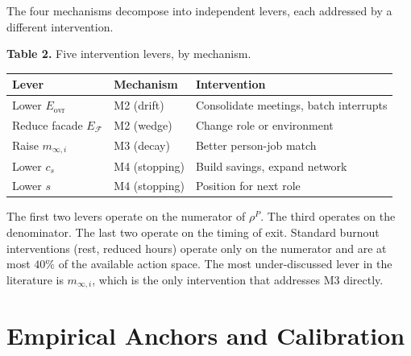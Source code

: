 \documentclass[11pt]{article}
\begin{document}
The four mechanisms decompose into independent levers, each addressed by a
different intervention.

\begin{center}
\textbf{Table 2.} Five intervention levers, by mechanism.

\medskip
\begin{tabular}{lll}
\toprule
Lever & Mechanism & Intervention \\
\midrule
Lower $E_{\text{ovr}}$         & M2 (drift)          & Consolidate meetings, batch interrupts \\
Reduce facade $E_{\mathcal{F}}$ & M2 (wedge)          & Change role or environment \\
Raise $m_{\infty,i}$           & M3 (decay)          & Better person-job match \\
Lower $c_s$                    & M4 (stopping)       & Build savings, expand network \\
Lower $s$                      & M4 (stopping)       & Position for next role \\
\bottomrule
\end{tabular}
\end{center}

\medskip\noindent The first two levers operate on the numerator of $\rho^P$.
The third operates on the denominator. The last two operate on the timing of
exit. Standard burnout interventions (rest, reduced hours) operate only on
the numerator and are at most $40\%$ of the available action space. The most
under-discussed lever in the literature is $m_{\infty,i}$, which is the only
intervention that addresses M3 directly.

\section{Empirical Anchors and Calibration}
\end{document}
